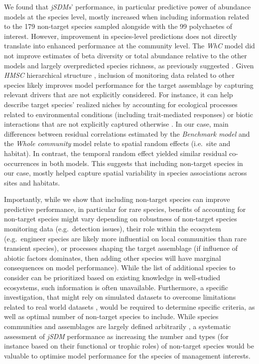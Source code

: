 \documentclass[9pt,biorxiv,doublespacing,lineno]{lapreprint}
\begin{document}
We found that \emph{jSDMs}' performance, in particular predictive power
of abundance models at the species level, mostly increased when
including information related to the 179 non-target species sampled
alongside with the 99 polychaetes of interest. However, improvement in
species-level predictions does not directly translate into enhanced
performance at the community level. The \emph{WhC} model did not improve
estimates of beta diversity or total abundance relative to the other
models and largely overpredicted species richness, as previously
suggested \autocite{Zurell_2018}. Given \emph{HMSC} hierarchical
structure \autocite{Poggiato_2021}, inclusion of monitoring data related
to other species likely improves model performance for the target
assemblage by capturing relevant drivers that are not explicitly
considered. For instance, it can help describe target species' realized
niches by accounting for ecological processes related to environmental
conditions (including trait-mediated responses) or biotic interactions
that are not explicitly captured otherwise \autocite{Ovaskainen_2017a}.
In our case, main differences between residual correlations estimated by
the \emph{Benchmark model} and the \emph{Whole community} model relate
to spatial random effects (i.e.~site and habitat). In contrast, the
temporal random effect yielded similar residual co-occurrences in both
models. This suggests that including non-target species in our case,
mostly helped capture spatial variability in species associations across
sites and habitats.

Importantly, while we show that including non-target species can improve
predictive performance, in particular for rare species, benefits of
accounting for non-target species might vary depending on robustness of
non-target species monitoring data (e.g.~detection issues), their role
within the ecosystem (e.g.~engineer species are likely more influential
on local communities than rare transient species), or processes shaping
the target assemblage (if influence of abiotic factors dominates, then
adding other species will have marginal consequences on model
performance). While the list of additional species to consider can be
prioritized based on existing knowledge in well-studied ecosystems, such
information is often unavailable. Furthermore, a specific investigation,
that might rely on simulated datasets to overcome limitations related to
real world datasets \autocite{DiRenzo_2022}, would be required to
determine specific criteria, as well as optimal number of non-target
species to include. While species communities and assemblages are
largely defined arbitrarily \autocite{Stroud_2015}, a systematic
assessment of \emph{jSDM} performance as increasing the number and types
(for instance based on their functional or trophic roles) of non-target
species would be valuable to optimise model performance for the species
of management interests.
\end{document}
